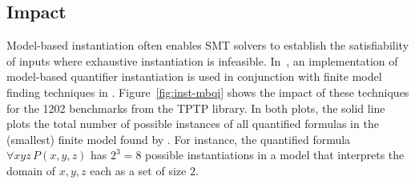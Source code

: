 \documentclass[oribibl]{llncs}
\begin{document}
\subsection{Impact}
Model-based instantiation often enables SMT solvers to
establish the satisfiability of inputs where exhaustive instantiation is infeasible.
In~\cite{ReyEtAl-CADE-13}, an implementation of model-based quantifier instantiation is used
in conjunction with finite model finding techniques in \cvc.
Figure~\ref{fig:inst-mbqi} shows the impact of these techniques for the 1202
benchmarks from the TPTP library.
In both plots, the solid line plots the total number of possible instances of all quantified formulas
in the (smallest) finite model found by \cvc.
For instance, the quantified formula $\forall xyz\, P( x, y, z )$ has $2^3 = 8$ possible instantiations
in a model that interprets the domain of $x,y,z$ each as a set of size $2$.
\end{document}
